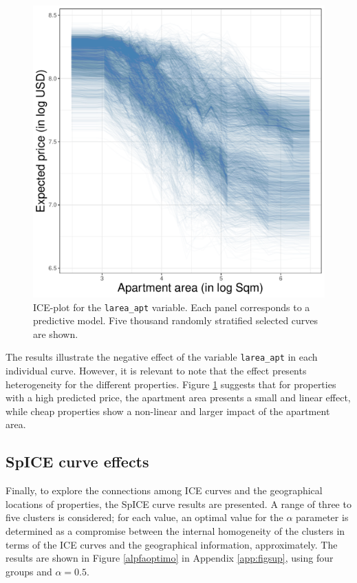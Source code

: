 \documentclass[smallextended,natbib]{svjour3}\usepackage[]{graphicx}\usepackage[]{xcolor}
\newcommand{\1}[1]{\mathbbm{1}_{#1}}
\begin{document}
\begin{figure} 
    \centering
    \includegraphics[scale=0.5]{figures/fig-ice-sup-decRF.pdf}
    \caption{ICE-plot for the \texttt{larea\_apt} variable. Each panel corresponds to a predictive model. Five thousand randomly stratified selected curves are shown.}
    \label{fig-icesupRF}
\end{figure}

The results illustrate the negative effect of the variable \texttt{larea\_apt} in each individual curve. However, it is relevant to note that the effect  presents  heterogeneity for the different properties. Figure \ref{fig-icesupRF} suggests that for properties with a high predicted price, the apartment area presents a small and linear effect, while cheap properties show a non-linear and larger impact of the apartment area. 

\subsection{SpICE curve effects} \label{results-ice}
Finally, to explore the connections among ICE curves and the geographical locations of properties, the SpICE curve results are presented.  
A range of three to five clusters is considered; for each value, an optimal value for the $\alpha$ parameter is determined as a compromise between the internal homogeneity of the clusters in terms of the ICE curves and the geographical information, approximately. The results are shown in Figure \ref{alpfaoptimo} in Appendix \ref{app:figsup}, using four groups and $\alpha = 0.5$.
\end{document}
